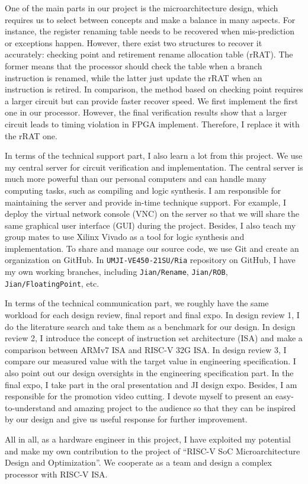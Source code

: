 One of the main parts in our project is the microarchitecture design, which requires us to select between concepts and make a balance in many aspects. For instance, the register renaming table needs to be recovered when mis-prediction or exceptions happen. However, there exist two structures to recover it accurately: checking point and retirement rename allocation table (rRAT). The former means that the processor should check the table when a branch instruction is renamed, while the latter just update the rRAT when an instruction is retired. In comparison, the method based on checking point requires a larger circuit but can provide faster recover speed. We first implement the first one in our processor. However, the final verification results show that a larger circuit leads to timing violation in FPGA implement. Therefore, I replace it with the rRAT one.

In terms of the technical support part, I also learn a lot from this project. We use my central server for circuit verification and implementation. The central server is much more powerful than our personal computers and can handle many computing tasks, such as compiling and logic synthesis. I am responsible for maintaining the server and provide in-time technique support. For example, I deploy the virtual network console (VNC) on the server so that we will share the same graphical user interface (GUI) during the project. Besides, I also teach my group mates to use Xilinx Vivado as a tool for logic synthesis and implementation. To share and manage our source code, we use Git and create an organization on GitHub. In \texttt{UMJI-VE450-21SU/Ria} repository on GitHub, I have my own working branches, including \texttt{Jian/Rename}, \texttt{Jian/ROB}, \texttt{Jian/FloatingPoint}, etc.

In terms of the technical communication part, we roughly have the same workload for each design review, final report and final expo. In design review 1, I do the literature search and take them as a benchmark for our design. In design review 2, I introduce the concept of instruction set architecture (ISA) and make a comparison between ARMv7 ISA and RISC-V 32G ISA. In design review 3, I compare our measured value with the target value in engineering specification. I also point out our design oversights in the engineering specification part. In the final expo, I take part in the oral presentation and JI design expo. Besides, I am responsible for the promotion video cutting. I devote myself to present an easy-to-understand and amazing project to the audience so that they can be inspired by our design and give us useful response for further improvement.

All in all, as a hardware engineer in this project, I have exploited my potential and make my own contribution to the project of ``RISC-V SoC Microarchitecture Design and Optimization''. We cooperate as a team and design a complex processor with RISC-V ISA.
